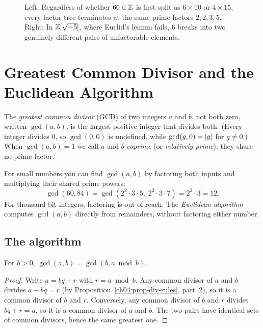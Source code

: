 \begin{figure}[htbp]
\caption{Left: Regardless of whether $60 \in \mathbb{Z}$ is first split as $6 \times 10$ or $4 \times 15$, every factor tree terminates at the same prime factors $2, 2, 3, 5$. Right: In $\mathbb{Z}[\sqrt{-5}]$, where Euclid's lemma fails, $6$ breaks into two genuinely different pairs of unfactorable elements.}
\label{fig:ch04-factor-trees}
\end{figure}

\section{Greatest Common Divisor and the Euclidean Algorithm}
\label{ch04:euclid}

\begin{definition}
\label{ch04:def-gcd}
The \emph{greatest common divisor} (GCD) of two integers $a$ and $b$, not both zero, written
$\gcd(a, b)$, is the largest positive integer that divides both. (Every integer divides $0$, so
$\gcd(0, 0)$ is undefined, while $\gcd(g, 0) = \lvert g\rvert$ for $g \neq 0$.) When $\gcd(a, b) = 1$ we
call $a$ and $b$ \emph{coprime} (or \emph{relatively prime}): they share no prime factor.
\end{definition}

For small numbers you can find $\gcd(a,b)$ by factoring both inputs and multiplying their shared
prime powers:
\[
  \gcd(60, 84) = \gcd(2^2 \cdot 3 \cdot 5,\; 2^2 \cdot 3 \cdot 7) = 2^2 \cdot 3 = 12.
\]
For thousand-bit integers, factoring is out of reach. The \emph{Euclidean algorithm} computes
$\gcd(a, b)$ directly from remainders, without factoring either number.

\subsection*{The algorithm}

\begin{lemma}
\label{ch04:lem-gcd-mod}
For $b > 0$, $\gcd(a, b) = \gcd(b, a \bmod b)$.
\end{lemma}

\begin{proof}
Write $a = bq + r$ with $r = a \bmod b$. Any common divisor of $a$ and $b$ divides
$a - bq = r$ (by Proposition~\ref{ch04:prop-div-rules}, part~2), so it is a common divisor of $b$
and $r$. Conversely, any common divisor of $b$ and $r$ divides $bq + r = a$, so it is a common
divisor of $a$ and $b$. The two pairs have identical sets of common divisors, hence the same
greatest one.
\end{proof}

